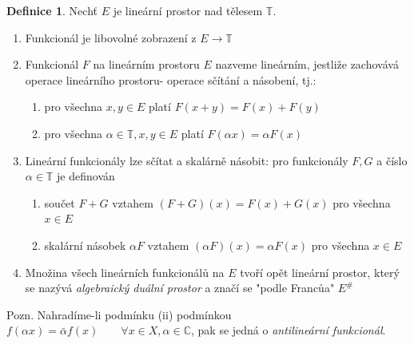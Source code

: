 \documentclass[a4]{report}
\theoremstyle{definition}
\newtheorem{definition}{Definice}[section]
\begin{document}
{\begin{definition}
Nechť $E$  je lineární prostor nad tělesem $\mathbb{T}$.
\begin{enumerate}
\item Funkcionál je libovolné zobrazení z $E \rightarrow \mathbb{T}$
\item Funkcionál $F$ na lineárním prostoru $E$ nazveme lineárním, jestliže zachovává operace lineárního prostoru- operace sčítání a násobení, tj.: \begin{enumerate}
\item pro všechna $x,y \in E$ platí $F(x+y)=F(x)+F(y)$
\item pro všechna $\alpha \in \mathbb{T,} x,y \in E$ platí $F(\alpha x)=\alpha F(x)$
\end{enumerate}
\item Lineární funkcionály lze sčítat a skalárně násobit: pro funkcionály $F,G$ a číslo $\alpha \in \mathbb{T}$ je definován \begin{enumerate}
\item součet $F+G$ vztahem $(F+G)(x)=F(x)+G(x) $ pro všechna $x \in E$
\item skalární násobek $\alpha F$ vztahem $(\alpha F)(x)=\alpha F(x) $ pro všechna $x \in E$
\end{enumerate}
\item Množina všech lineárních funkcionálů na $E$ tvoří opět lineární prostor, který se nazývá \textit{algebraický duální prostor} a značí se "podle Francůa"  $E^{\#}$
\end{enumerate}
\end{definition}

Pozn. Nahradíme-li podmínku (ii) podmínkou $f(\alpha x)=\bar{\alpha} f(x) \qquad \forall x \in X,\alpha \in \mathbb{C}$, pak se jedná o \textit{antilineární funkcionál}. 

 

}
\end{document}
